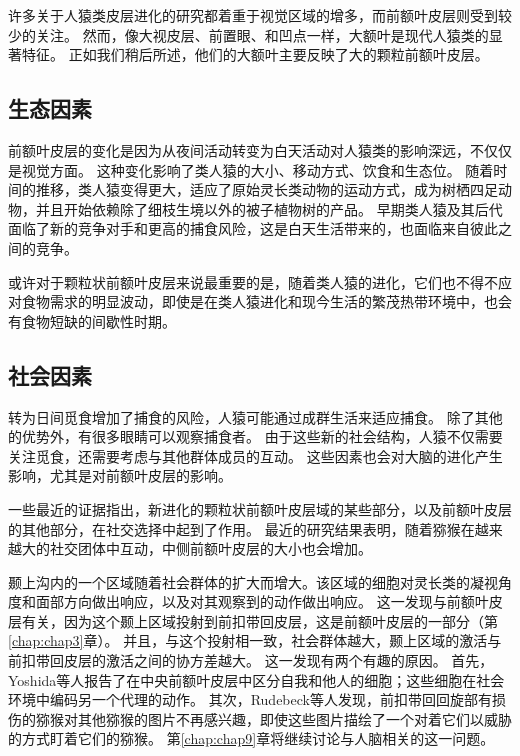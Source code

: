 许多关于人猿类皮层进化的研究都着重于视觉区域的增多\cite{kaas2020evolution}，而前额叶皮层则受到较少的关注。
然而，像大视皮层、前置眼、和凹点一样，大额叶是现代人猿类的显著特征。
正如我们稍后所述，他们的大额叶主要反映了大的颗粒前额叶皮层。



\subsection{生态因素}

前额叶皮层的变化是因为从夜间活动转变为白天活动对人猿类的影响深远，不仅仅是视觉方面。
这种变化影响了类人猿的大小、移动方式、饮食和生态位。
随着时间的推移，类人猿变得更大，适应了原始灵长类动物的运动方式，成为树栖四足动物，并且开始依赖除了细枝生境以外的被子植物树的产品。
早期类人猿及其后代面临了新的竞争对手和更高的捕食风险，这是白天生活带来的，也面临来自彼此之间的竞争。


或许对于颗粒状前额叶皮层来说最重要的是，随着类人猿的进化，它们也不得不应对食物需求的明显波动，即使是在类人猿进化和现今生活的繁茂热带环境中，也会有食物短缺的间歇性时期\cite{jf1987food}。



\subsection{社会因素}

转为日间觅食增加了捕食的风险，人猿可能通过成群生活来适应捕食。
除了其他的优势外，有很多眼睛可以观察捕食者。
由于这些新的社会结构，人猿不仅需要关注觅食，还需要考虑与其他群体成员的互动。
这些因素也会对大脑的进化产生影响，尤其是对前额叶皮层的影响。


一些最近的证据指出，新进化的颗粒状前额叶皮层域的某些部分，以及前额叶皮层的其他部分，在社交选择中起到了作用。
最近的研究结果表明，随着猕猴在越来越大的社交团体中互动，中侧前额叶皮层的大小也会增加\cite{sallet2011social}。


颞上沟内的一个区域随着社会群体的扩大而增大。该区域的细胞对灵长类的凝视角度和面部方向做出响应\cite{perrett1985visual}，以及对其观察到的动作做出响应\cite{jellema2003cells}。
这一发现与前额叶皮层有关，因为这个颞上区域投射到前扣带回皮层，这是前额叶皮层的一部分（第\ref{chap:chap3}章）。
并且，与这个投射相一致，社会群体越大，颞上区域的激活与前扣带回皮层的激活之间的协方差越大\cite{sallet2011social}。
这一发现有两个有趣的原因。
首先，Yoshida等人\cite{yoshida2011representation}报告了在中央前额叶皮层中区分自我和他人的细胞；这些细胞在社会环境中编码另一个代理的动作。
其次，Rudebeck等人\cite{rudebeck2006role}发现，前扣带回回旋部有损伤的猕猴对其他猕猴的图片不再感兴趣，即使这些图片描绘了一个对着它们以威胁的方式盯着它们的猕猴。
第\ref{chap:chap9}章将继续讨论与人脑相关的这一问题。



